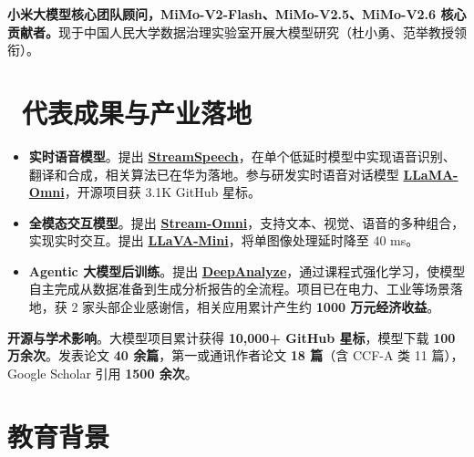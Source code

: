 \documentclass{resume}
\begin{document}
\vspace{2mm}

\textbf{小米大模型核心团队顾问，MiMo-V2-Flash、MiMo-V2.5、MiMo-V2.6 核心贡献者。}现于中国人民大学数据治理实验室开展大模型研究（杜小勇、范举教授领衔）。

\section{\textcolor{red1}{\faBarChart\ 代表成果与产业落地}}
\begin{itemize}[itemsep=2pt,parsep=0.3ex]
    \item \textbf{实时语音模型}。提出 \textbf{\href{https://github.com/ictnlp/StreamSpeech}{StreamSpeech}}，在单个低延时模型中实现语音识别、翻译和合成，相关算法已在华为落地。参与研发实时语音对话模型 \mbox{\textbf{\href{https://github.com/ictnlp/LLaMA-Omni}{LLaMA-Omni}}}，开源项目获 3.1K GitHub 星标。
    \item \textbf{全模态交互模型}。提出 \textbf{\href{https://github.com/ictnlp/Stream-Omni}{Stream-Omni}}，支持文本、视觉、语音的多种组合，实现实时交互。提出 \textbf{\href{https://github.com/ictnlp/LLaVA-Mini}{LLaVA-Mini}}，将单图像处理延时降至 40 ms。
    \item \textbf{Agentic 大模型后训练}。提出 \textbf{\href{https://github.com/ruc-datalab/DeepAnalyze}{DeepAnalyze}}，通过课程式强化学习，使模型自主完成从数据准备到生成分析报告的全流程。项目已在电力、工业等场景落地，获 2 家头部企业感谢信，相关应用累计产生约 \textbf{1000 万元经济收益}。
\end{itemize}

\vspace{1mm}

\textbf{开源与学术影响}。大模型项目累计获得 \textbf{10,000+ GitHub 星标}，模型下载 \textbf{100 万余次}。发表论文 \textbf{40 余篇}，第一或通讯作者论文 \textbf{18 篇}（含 CCF-A 类 11 篇），Google Scholar 引用 \textbf{1500 余次}。


\section{\textcolor{red1}{\faGraduationCap 教育背景}}
\end{document}
